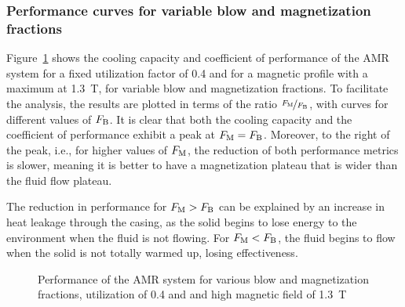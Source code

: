 \documentclass[referee]{svjour3}
\begin{document}
\subsubsection{Performance curves for variable blow and magnetization fractions}
\label{sec:perf-curv-vary}

Figure~\ref{fig:Qc_COP_curves_phi40} shows the cooling capacity and coefficient of performance of the AMR system for a fixed utilization factor of \num{0.4} and for a magnetic profile with a maximum at \SI{1.3}{\tesla}, for variable blow and magnetization fractions. To facilitate the analysis, the results are plotted in terms of the ratio $\nicefrac{F_{\mathrm{M}}}{F_{\mathrm{B}}}$, with curves for different values of $F_{\mathrm{B}}$. It is clear that both the cooling capacity and the coefficient of performance exhibit a peak at $F_{\mathrm{M}} = F_{\mathrm{B}}$. Moreover, to the right of the peak, i.e., for higher values of $F_{\mathrm{M}}$, the reduction of both performance metrics is slower, meaning it is better to have a magnetization plateau that is wider than the fluid flow plateau.

The reduction in performance for $F_{\mathrm{M}} > F_{\mathrm{B}}$ can be explained by an increase in heat leakage through the casing, as the solid begins to lose energy to the environment when the fluid is not flowing. For $F_{\mathrm{M}} < F_{\mathrm{B}}$,  the fluid begins to flow when the solid is not totally warmed up, losing effectiveness.

\begin{figure}[!ht]
  \centering
\quad
  \caption{Performance of the AMR system for various blow and magnetization fractions, utilization of 0.4 and and high magnetic field of \SI{1.3}{\tesla}}
  \label{fig:Qc_COP_curves_phi40}
\end{figure}
\end{document}
